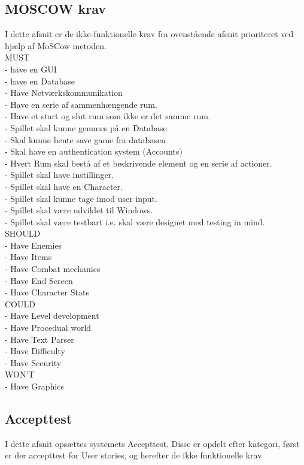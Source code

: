 \subsection{MOSCOW krav}
I dette afsnit er de ikke-funktionelle krav fra ovenstående afsnit prioriteret ved hjælp af MoSCow metoden.\\
MUST\\
  - have en GUI\\
  - have en Database\\
  - Have Netværkskommunikation\\
  - Have en serie af sammenhængende rum.\\
  - Have et start og slut rum som ikke er det samme rum.\\
  - Spillet skal kunne gemmes på en Database.\\
  - Skal kunne hente save game fra databasen\\
  - Skal have en authentication system (Accounts)\\
  - Hvert Rum skal bestå af et beskrivende element og en serie af actioner.\\
  - Spillet skal have instillinger.\\
  - Spillet skal have en Character.\\
  - Spillet skal kunne tage imod user input.\\
  - Spillet skal være udviklet til Windows.\\
  - Spillet skal være testbart i.e. skal være designet med testing in mind.\\

SHOULD\\
  - Have Enemies\\
  - Have Items\\
  - Have Combat mechanics\\
  - Have End Screen\\
  - Have Character Stats\\

COULD\\
  - Have Level development\\
  - Have Procedual world\\
  - Have Text Parser\\
  - Have Difficulty\\
  - Have Security\\

WON'T\\
  - Have Graphics\\

\subsection{Accepttest}
I dette afsnit opsættes systemets Accepttest. Disse er opdelt efter kategori, først er der accepttest for User stories, og herefter de ikke funktionelle krav.

